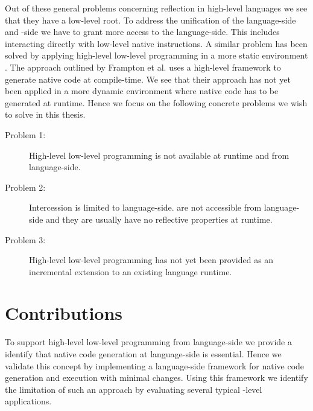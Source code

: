\noindent Out of these general problems concerning reflection in high-level languages we see that they have a low-level root.
To address the unification of the language-side and \VM-side we have to grant more access to the language-side.
This includes interacting directly with low-level native instructions.
A similar problem has been solved by applying high-level low-level programming in a more static environment \cite{Fram09a,Graal}.
The approach outlined by Frampton et al. uses a high-level framework to generate native code at compile-time.
We see that their approach has not yet been applied in a more dynamic environment where native code has to be generated at runtime.
Hence we focus on the following concrete problems we wish to solve in this thesis.

\begin{description}
	\item[Problem 1:] High-level low-level programming is not available at runtime and from language-side.
	
	\item[Problem 2:] Intercession is limited to language-side.
	\VMs are not accessible from language-side and they are usually have no reflective properties at runtime.
	
	\item[Problem 3:] High-level low-level programming has not yet been provided as an incremental extension to an existing language runtime.
\end{description}

\section{Contributions}

To support high-level low-level programming from language-side we provide a identify that native code generation at language-side is essential.
Hence we validate this concept by implementing a language-side framework for native code generation and execution with minimal \VM changes.
Using this framework we identify the limitation of such an approach by evaluating several typical \VM-level applications.



